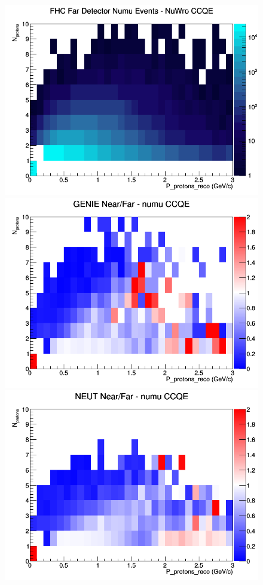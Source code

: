 \begin{figure}[h]
\endminipage
{}
\includegraphics[width=\linewidth]{eff_N_P/FGT/protons/CCQE_FHC_FD_numu_N_P_NuWro.png}
\endminipage
\newline
{}
\includegraphics[width=\linewidth]{eff_N_P/FGT/protons/ratios/CCQE_GENIE_numu_NF_N_P.png}
\endminipage
{}
\includegraphics[width=\linewidth]{eff_N_P/FGT/protons/ratios/CCQE_NEUT_numu_NF_N_P.png}

\end{figure}
